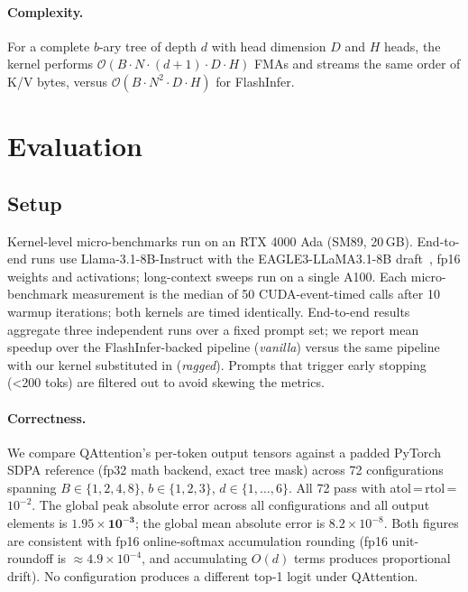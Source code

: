 \documentclass{article}
\newcommand{\method}{QAttention}
\newcommand{\bigO}[1]{\mathcal{O}(#1)}
\newcommand{\numtokens}{N}
\newcommand{\depth}{d}
\newcommand{\branching}{b}
\newcommand{\headdim}{D}
\newcommand{\nheads}{H}
\newcommand{\batchsize}{B}
\begin{document}
\paragraph{Complexity.}
For a complete $\branching$-ary tree of depth $\depth$ with head
dimension $\headdim$ and $\nheads$ heads, the kernel performs
$\bigO{\batchsize\!\cdot\!\numtokens\!\cdot\!(\depth{+}1)\!\cdot\!\headdim\!\cdot\!\nheads}$
FMAs and streams the same order of K/V bytes, versus
$\bigO{\batchsize\!\cdot\!\numtokens^2\!\cdot\!\headdim\!\cdot\!\nheads}$
for FlashInfer.

\section{Evaluation}
\label{sec:eval}

\subsection{Setup}
\label{sec:eval-setup}

Kernel-level micro-benchmarks run on an RTX 4000 Ada (SM89, 20\,GB).
End-to-end runs use Llama-3.1-8B-Instruct with the EAGLE3-LLaMA3.1-8B
draft~\cite{li2025eagle3}, fp16 weights and activations; long-context
sweeps run on a single A100. Each micro-benchmark measurement is the
median of 50 CUDA-event-timed calls after 10 warmup iterations; both
kernels are timed identically. End-to-end results aggregate three
independent runs over a fixed prompt set; we report mean speedup over
the FlashInfer-backed pipeline (\emph{vanilla}) versus the same
pipeline with our kernel substituted in (\emph{ragged}). Prompts
that trigger early stopping (\textless 200 toks) are filtered out to avoid skewing the metrics.

\paragraph{Correctness.}
We compare \method{}'s per-token output tensors against a padded
PyTorch SDPA reference (fp32 math backend, exact tree mask) across
72 configurations spanning $\batchsize \in \{1,2,4,8\}$,
$\branching \in \{1,2,3\}$, $\depth \in \{1,\ldots,6\}$.
All 72 pass with atol\,=\,rtol\,=\,$10^{-2}$.
The global peak absolute error across all configurations and all
output elements is $\mathbf{1.95 \times 10^{-3}}$; the global mean
absolute error is $8.2 \times 10^{-8}$.
Both figures are consistent with fp16 online-softmax accumulation
rounding (fp16 unit-roundoff is $\approx 4.9 \times 10^{-4}$, and
accumulating $O(\depth)$ terms produces proportional drift).
No configuration produces a different top-1 logit under \method{}.
\end{document}
